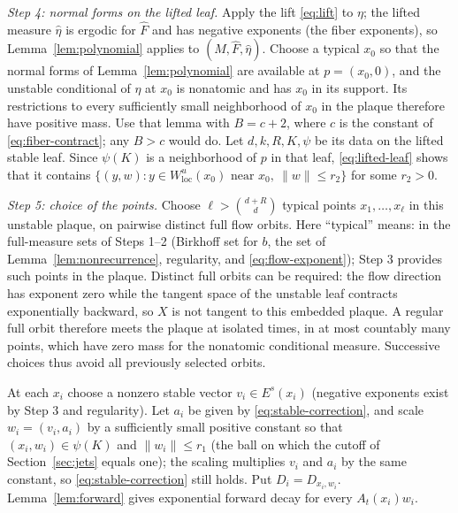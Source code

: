 \documentclass[12pt]{article}
\theoremstyle{remark}
\begin{document}
\emph{Step 4: normal forms on the lifted leaf.}
Apply the lift \eqref{eq:lift} to \(\eta\); the lifted measure
\(\widehat\eta\) is ergodic for \(\widehat F\) and has negative
exponents (the fiber exponents), so Lemma~\ref{lem:polynomial}
applies to \((\widehat M,\widehat F,\widehat\eta)\).
Choose a typical \(x_0\) so that the normal forms of
Lemma~\ref{lem:polynomial} are available at \(p=(x_0,0)\), and the
unstable conditional of \(\eta\) at \(x_0\) is nonatomic and has
\(x_0\) in its support.  Its restrictions to every sufficiently small
neighborhood of \(x_0\) in the plaque therefore have positive mass.
Use that lemma with \(B=c+2\),
where \(c\) is the constant of \eqref{eq:fiber-contract}; any
\(B>c\) would do.
Let \(d,k,R,K,\psi\) be its data on the lifted stable leaf.
Since \(\psi(K)\) is a neighborhood of \(p\) in that leaf,
\eqref{eq:lifted-leaf} shows that it contains
\(\{(y,w):y\in W^u_{\mathrm{loc}}(x_0)\text{ near }x_0,\ \|w\|\le r_2\}\)
for some \(r_2>0\).

\emph{Step 5: choice of the points.}
Choose
\(\ell>\binom{d+R}{d}\) typical points \(x_1,\ldots,x_\ell\)
in this unstable plaque, on pairwise distinct full flow orbits.
Here ``typical'' means: in the full-measure sets of Steps 1--2
(Birkhoff set for \(b\), the set of Lemma~\ref{lem:nonrecurrence},
regularity, and \eqref{eq:flow-exponent}); Step 3 provides such points
in the plaque.
Distinct full orbits can be required: the flow direction has
exponent zero while the tangent space of the unstable leaf contracts
exponentially backward, so \(X\) is not tangent to this embedded
plaque.  A regular full orbit therefore meets the plaque at isolated
times, in at most countably many points, which have zero mass for
the nonatomic conditional measure.  Successive choices thus avoid
all previously selected orbits.

At each \(x_i\) choose a nonzero stable vector \(v_i\in E^s(x_i)\)
(negative exponents exist by Step 3 and regularity).
Let \(a_i\) be given by \eqref{eq:stable-correction}, and scale
\(w_i=(v_i,a_i)\) by a sufficiently small positive constant so that
\((x_i,w_i)\in\psi(K)\) and \(\|w_i\|\le r_1\) (the ball on which the
cutoff of Section~\ref{sec:jets} equals one); the scaling multiplies
\(v_i\) and \(a_i\) by the same constant, so
\eqref{eq:stable-correction} still holds.
Put \(D_i=D_{x_i,w_i}\).
Lemma~\ref{lem:forward} gives exponential forward decay for every
\(A_t(x_i)w_i\).
\end{document}
